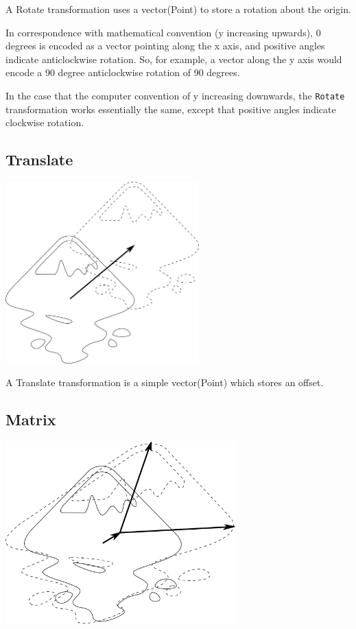 \documentclass[openany]{book}
\newcommand{\code}[1]{\textsf{#1}}
\begin{document}
A \code{Rotate} transformation uses a vector(\code{Point}) to store
a rotation about the origin.

In correspondence with mathematical convention (y increasing upwards),
0 degrees is encoded as a vector pointing along the x axis, and positive
angles indicate anticlockwise rotation.  So, for example, a vector along
the y axis would encode a 90 degree anticlockwise rotation of 90 degrees.

In the case that the computer convention of y increasing downwards,
the \verb}Rotate} transformation works essentially the same, except
that positive angles indicate clockwise rotation.

\subsection{Translate}

\includegraphics[height=70mm]{media/translate.png}

A \code{Translate} transformation is a simple vector(\code{Point})
which stores an offset.

\subsection{Matrix}

\includegraphics[height=70mm]{media/matrix.png}
\end{document}
